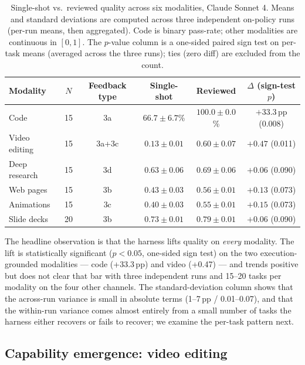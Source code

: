 \begin{table}[t]
\centering
\caption{Single-shot vs.\ reviewed quality across six modalities, Claude Sonnet 4. Means and standard deviations are computed across three independent on-policy runs (per-run means, then aggregated). Code is binary pass-rate; other modalities are continuous in $[0,1]$. The $p$-value column is a one-sided paired sign test on per-task means (averaged across the three runs); ties (zero diff) are excluded from the count.}
\label{tab:harness-headline}
\small
\begin{tabular}{lccccc}
\toprule
Modality & $N$ & Feedback type & Single-shot & Reviewed & $\Delta$ (sign-test $p$) \\
\midrule
Code            & 15 & 3a       & $66.7 \pm 6.7$\%   & $\mathbf{100.0 \pm 0.0}$\% & $\mathbf{+33.3}$\,pp (0.008) \\
Video editing   & 15 & 3a+3c    & $0.13 \pm 0.01$    & $\mathbf{0.60 \pm 0.07}$   & $\mathbf{+0.47}$ (0.011) \\
Deep research   & 15 & 3d       & $0.63 \pm 0.06$    & $\mathbf{0.69 \pm 0.06}$   & $+0.06$ (0.090) \\
Web pages       & 15 & 3b       & $0.43 \pm 0.03$    & $\mathbf{0.56 \pm 0.01}$   & $+0.13$ (0.073) \\
Animations      & 15 & 3c       & $0.40 \pm 0.03$    & $\mathbf{0.55 \pm 0.01}$   & $+0.15$ (0.073) \\
Slide decks     & 20 & 3b       & $0.73 \pm 0.01$    & $\mathbf{0.79 \pm 0.01}$   & $+0.06$ (0.090) \\
\bottomrule
\end{tabular}
\end{table}

The headline observation is that the harness lifts quality on \emph{every} modality. The lift is statistically significant ($p < 0.05$, one-sided sign test) on the two execution-grounded modalities --- code (+33.3\,pp) and video (+0.47) --- and trends positive but does not clear that bar with three independent runs and 15--20 tasks per modality on the four other channels. The standard-deviation column shows that the across-run variance is small in absolute terms (1--7\,pp / 0.01--0.07), and that the within-run variance comes almost entirely from a small number of tasks the harness either recovers or fails to recover; we examine the per-task pattern next.

\subsection{Capability emergence: video editing}
\label{sec:harness-emergence}

